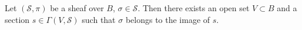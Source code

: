 Let $(\mathcal{S}, \pi)$ be a sheaf over $B$, $\sigma \in \mathcal{S}$. Then there exists an open set $V \subset B$ and a section $s \in \Gamma(V, \mathcal{S})$ such that $\sigma$ belongs to the image of $s$.
